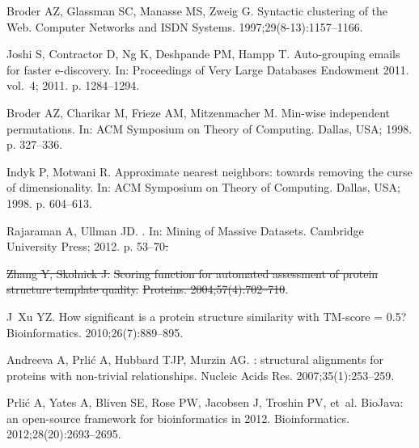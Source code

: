 \documentclass[10pt,letterpaper]{article}
\providecommand{\DIFdeltex}[1]{{\protect\color{red}\sout{#1}}}                      %
\providecommand{\DIFaddend}{} %
\providecommand{\DIFdelbegin}{} %
\providecommand{\DIFdelend}{} %
\providecommand{\DIFdel}[1]{\texorpdfstring{\DIFdeltex{#1}}{}} %
\newcommand{\DIFscaledelfig}{0.5}
\newlength{\DIFdelgraphicswidth} %
\newlength{\DIFdelgraphicsheight} %
\newcommand{\DIFdelincludegraphics}[2][]{%
\sbox{\DIFdelgraphicsbox}{\DIFOincludegraphics[#1]{#2}}%
\settoboxwidth{\DIFdelgraphicswidth}{\DIFdelgraphicsbox} %
\settoboxtotalheight{\DIFdelgraphicsheight}{\DIFdelgraphicsbox} %
\scalebox{\DIFscaledelfig}{%
\parbox[b]{\DIFdelgraphicswidth}{\usebox{\DIFdelgraphicsbox}\\[-\baselineskip] \rule{\DIFdelgraphicswidth}{0em}}\llap{\resizebox{\DIFdelgraphicswidth}{\DIFdelgraphicsheight}{%
\setlength{\unitlength}{\DIFdelgraphicswidth}%
\begin{picture}(1,1)%
\thicklines\linethickness{2pt} %
{\color[rgb]{1,0,0}\put(0,0){\framebox(1,1){}}}%
{\color[rgb]{1,0,0}\put(0,0){\line( 1,1){1}}}%
{\color[rgb]{1,0,0}\put(0,1){\line(1,-1){1}}}%
\end{picture}%
}\hspace*{3pt}}} %
} %
\DeclareRobustCommand{\DIFaddend}{\DIFOaddend \let\includegraphics\DIFOincludegraphics} %
\DeclareRobustCommand{\DIFdelbegin}{\DIFOdelbegin \let\includegraphics\DIFdelincludegraphics} %
\DeclareRobustCommand{\DIFdelend}{\DIFOaddend \let\includegraphics\DIFOincludegraphics} %
\begin{document}
\begin{thebibliography}{10}
\DIFaddend {}
Broder AZ, Glassman SC, Manasse MS, Zweig G.
\newblock Syntactic clustering of the Web.
\newblock Computer Networks and ISDN Systems. 1997;29(8-13):1157--1166.

Joshi S, Contractor D, Ng K, Deshpande PM, Hampp T.
\newblock Auto-grouping emails for faster e-discovery.
\newblock In: Proceedings of Very Large Databases Endowment 2011. vol.~4; 2011.
  p. 1284--1294.

Broder AZ, Charikar M, Frieze AM, Mitzenmacher M.
\newblock Min-wise independent permutations.
\newblock In: ACM Symposium on Theory of Computing. Dallas, USA; 1998. p.
  327--336.

Indyk P, Motwani R.
\newblock Approximate nearest neighbors: towards removing the curse of
  dimensionality.
\newblock In: ACM Symposium on Theory of Computing. Dallas, USA; 1998. p.
  604--613.

Rajaraman A, Ullman JD.
.
\newblock In: Mining of Massive Datasets. Cambridge University Press; 2012. p.
  53--70\DIFdelbegin \DIFdel{.
}%

\DIFdel{Zhang Y, Skolnick J.
}%
\DIFdel{Scoring function for automated assessment of protein structure
  template quality.
}%
\DIFdel{Proteins. 2004;57(4):702--710}\DIFdelend .

J~Xu YZ.
\newblock How significant is a protein structure similarity with {TM}-score =
  0.5?
\newblock Bioinformatics. 2010;26(7):889--895.

Andreeva A, Prli{\'c} A, Hubbard TJP, Murzin AG.
: structural alignments for proteins with non-trivial
  relationships.
\newblock Nucleic Acids Res. 2007;35(1):253--259.

Prli{\'c} A, Yates A, Bliven SE, Rose PW, Jacobsen J, Troshin PV, et~al.
\newblock Bio{J}ava: an open-source framework for bioinformatics in 2012.
\newblock Bioinformatics. 2012;28(20):2693--2695.

\end{thebibliography}
\end{document}
